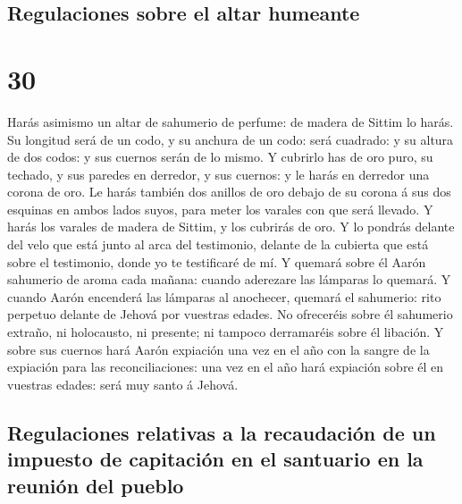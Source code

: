 \hypertarget{regulaciones-sobre-el-altar-humeante}{%
\subsection{Regulaciones sobre el altar
humeante}\label{regulaciones-sobre-el-altar-humeante}}

\hypertarget{section-29}{%
\section{30}\label{section-29}}

 Harás asimismo un altar de sahumerio de perfume: de madera
de Sittim lo harás.  Su longitud será de un codo, y su
anchura de un codo: será cuadrado: y su altura de dos codos: y sus
cuernos serán de lo mismo.  Y cubrirlo has de oro puro, su
techado, y sus paredes en derredor, y sus cuernos: y le harás en
derredor una corona de oro.  Le harás también dos anillos de
oro debajo de su corona á sus dos esquinas en ambos lados suyos, para
meter los varales con que será llevado.  Y harás los varales
de madera de Sittim, y los cubrirás de oro.  Y lo pondrás
delante del velo que está junto al arca del testimonio, delante de la
cubierta que está sobre el testimonio, donde yo te testificaré de mí.
 Y quemará sobre él Aarón sahumerio de aroma cada mañana:
cuando aderezare las lámparas lo quemará.  Y cuando Aarón
encenderá las lámparas al anochecer, quemará el sahumerio: rito perpetuo
delante de Jehová por vuestras edades.  No ofreceréis sobre
él sahumerio extraño, ni holocausto, ni presente; ni tampoco derramaréis
sobre él libación.  Y sobre sus cuernos hará Aarón
expiación una vez en el año con la sangre de la expiación para las
reconciliaciones: una vez en el año hará expiación sobre él en vuestras
edades: será muy santo á Jehová.

\hypertarget{regulaciones-relativas-a-la-recaudaciuxf3n-de-un-impuesto-de-capitaciuxf3n-en-el-santuario-en-la-reuniuxf3n-del-pueblo}{%
\subsection{Regulaciones relativas a la recaudación de un impuesto de
capitación en el santuario en la reunión del
pueblo}\label{regulaciones-relativas-a-la-recaudaciuxf3n-de-un-impuesto-de-capitaciuxf3n-en-el-santuario-en-la-reuniuxf3n-del-pueblo}}

